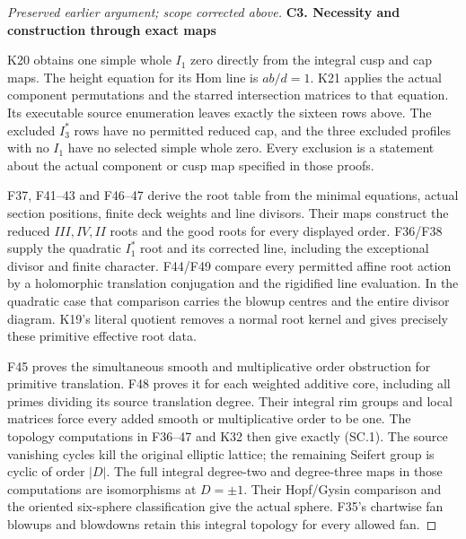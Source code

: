 \begin{proof}[Preserved earlier argument; scope corrected above]
\par

\medskip\noindent\textbf{C3. Necessity and construction through exact maps}

\par\nobreak

K20 obtains one simple whole \(I_1\) zero directly from
the integral cusp and cap maps. The height equation
for its Hom line is \(ab/d=1\). K21 applies the actual
component permutations and the starred intersection
matrices to that equation. Its executable source
enumeration leaves exactly the sixteen rows above.
The excluded \(I_3^*\) rows have no permitted reduced
cap, and the three excluded profiles with no \(I_1\)
have no selected simple whole zero. Every exclusion
is a statement about the actual component or cusp
map specified in those proofs.

F37, F41--43 and F46--47 derive the root table from
the minimal equations, actual section positions,
finite deck weights and line divisors. Their maps
construct the reduced \(III,IV,II\) roots and the
good roots for every displayed order. F36/F38 supply
the quadratic \(I_1^*\) root and its corrected
line, including the exceptional divisor and
finite character. F44/F49 compare every permitted
affine root action by a holomorphic translation
conjugation and the rigidified line evaluation.
In the quadratic case that comparison carries
the blowup centres and the entire divisor diagram.
K19's literal quotient removes a normal root
kernel and gives precisely these primitive
effective root data.

F45 proves the simultaneous smooth and multiplicative
order obstruction for primitive translation. F48
proves it for each weighted additive core, including
all primes dividing its source translation degree.
Their integral rim groups and local matrices force
every added smooth or multiplicative order to be one.
The topology computations in F36--47 and K32 then
give exactly (SC.1). The source vanishing cycles
kill the original elliptic lattice; the remaining
Seifert group is cyclic of order \(|D|\).
The full integral degree-two and degree-three maps
in those computations are isomorphisms at
\(D=\pm1\). Their Hopf/Gysin comparison and the
oriented six-sphere classification give the
actual sphere. F35's chartwise fan blowups and
blowdowns retain this integral topology for
every allowed fan.


\end{proof}
